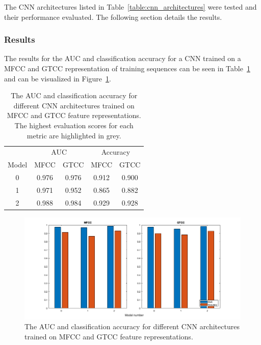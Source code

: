 The CNN architectures listed in Table~\ref{table:cnn_architectures} were tested
and their performance evaluated. The following section details the results.

\subsubsection{Results}

The results for the AUC and classification accuracy for a CNN trained on a MFCC
and GTCC representation of training sequences can be seen in
Table~\ref{table:cnn_mfcc_results} and can be visualized in
Figure~\ref{fig:cnn_mfcc_results}.

\begin{table}[ht]
\begin{center}
\begin{tabular}{c c c|c c}
\toprule
& \multicolumn{2}{c|}{AUC} & \multicolumn{2}{c}{Accuracy} \\
  Model & MFCC & GTCC & MFCC & GTCC \\ [0.5ex]
\midrule
  0 & 0.976 & 0.976 & 0.912 & 0.900 \\
  1 & 0.971 & 0.952 & 0.865 & 0.882 \\
  2 & \cellcolor{lightgray} 0.988 & \cellcolor{lightgray} 0.984 & \cellcolor{lightgray} 0.929 & \cellcolor{lightgray} 0.928 \\
\bottomrule
\end{tabular}
\caption{The AUC and classification accuracy for different CNN architectures
trained on MFCC and GTCC feature representations. The highest evaluation scores
for each metric are highlighted in grey.}\label{table:cnn_mfcc_results}
\end{center}
\end{table}

\begin{figure}[ht]
  \centering
  \includegraphics[width=\textwidth]{figures/hyp2_cnn_bar.png}
  \caption{The AUC and classification accuracy for different CNN architectures
  trained on MFCC and GTCC feature representations.}\label{fig:cnn_mfcc_results}
\end{figure}


